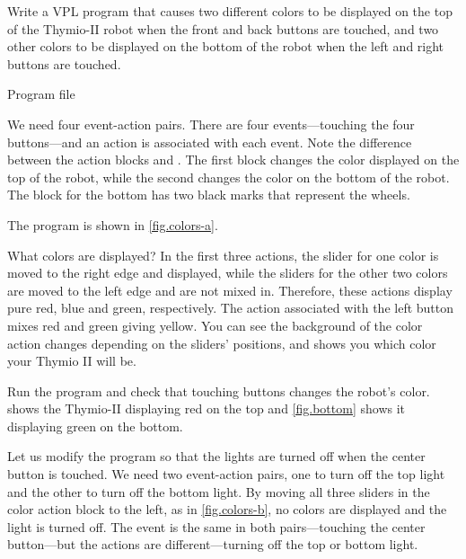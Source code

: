 

Write a VPL program that causes two different colors to be displayed on
the top of the Thymio-II robot when the front and back buttons are
touched, and two other colors to be displayed on the bottom of the robot
when the left and right buttons are touched.

{\raggedleft \hfill Program file }

We need four event-action pairs. There are four events---touching the
four buttons---and an action is associated with each event. Note the
difference between the action blocks  and
. The first block changes the color
displayed on the top of the robot, while the second changes the color on
the bottom of the robot. The block for the bottom has two black marks
that represent the wheels.

The program is shown in \cref{fig.colors-a}.

What colors are displayed? In the first three actions, the slider for
one color is moved to the right edge and displayed, while the sliders
for the other two colors are moved to the left edge and are not mixed
in. Therefore, these actions display pure red, blue and green,
respectively. The action associated with the left button mixes red and
green giving yellow.
You can see the background of the color action changes depending on the sliders' positions, and shows you which color your Thymio II will be.

Run the program and check that touching buttons changes the robot's color.
 shows the Thymio-II displaying red on
the top and \cref{fig.bottom} shows it displaying green on the
bottom.



Let us modify the program so that the lights are turned off when the
center button is touched. We need two event-action pairs, one to turn
off the top light and the other to turn off the bottom light.
By moving all three sliders in the color action block to the left, as in \cref{fig.colors-b}, no colors are displayed and the light is turned off.
The event is the same in both pairs---touching the center button---but
the actions are different---turning off the top or bottom light. 

